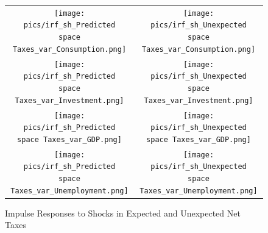 \documentclass[12pt]{article}
\begin{document}
\begin{figure}\caption{Impulse Responses to Shocks in Expected and Unexpected Net Taxes}\label{fg:irf_tax}
\begin{center}
\hspace*{-0.2in}\begin{tabular}{cc}
\texttt{[image: pics/irf\_sh\_Predicted\\space Taxes\_var\_Consumption.png]} & \texttt{[image: pics/irf\_sh\_Unexpected\\space Taxes\_var\_Consumption.png]} \\
\texttt{[image: pics/irf\_sh\_Predicted\\space Taxes\_var\_Investment.png]} & \texttt{[image: pics/irf\_sh\_Unexpected\\space Taxes\_var\_Investment.png]} \\
\texttt{[image: pics/irf\_sh\_Predicted\\space Taxes\_var\_GDP.png]} & \texttt{[image: pics/irf\_sh\_Unexpected\\space Taxes\_var\_GDP.png]} \\
\texttt{[image: pics/irf\_sh\_Predicted\\space Taxes\_var\_Unemployment.png]} & \texttt{[image: pics/irf\_sh\_Unexpected\\space Taxes\_var\_Unemployment.png]} 
\end{tabular}
\end{center}
\end{figure}
\end{document}
